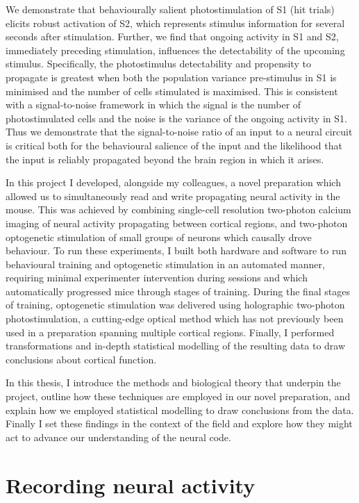 We demonstrate that behaviourally salient photostimulation of S1 (hit trials) elicits robust activation of S2, which represents stimulus information for several seconds after stimulation. Further, we find that ongoing activity in S1 and S2, immediately preceding stimulation, influences the detectability of the upcoming stimulus. Specifically, the photostimulus detectability and propensity to propagate is greatest when both the population variance pre-stimulus in S1 is minimised and the number of cells stimulated is maximised. This is consistent with a signal-to-noise framework in which the signal is the number of photostimulated cells and the noise is the variance of the ongoing activity in S1. Thus we demonstrate that the signal-to-noise ratio of an input to a neural circuit is critical both for the behavioural salience of the input and the likelihood that the input is reliably propagated beyond the brain region in which it arises.

In this project I developed, alongside my colleagues, a novel preparation which allowed us to simultaneously read and write propagating neural activity in the mouse. This was achieved by combining single-cell resolution two-photon calcium imaging of neural activity propagating between cortical regions, and two-photon optogenetic stimulation of small groups of neurons which causally drove behaviour. To run these experiments, I built both hardware and software to run behavioural training and optogenetic stimulation in an automated manner, requiring minimal experimenter intervention during sessions and which automatically progressed mice through stages of training. During the final stages of training, optogenetic stimulation was delivered using holographic two-photon photostimulation, a cutting-edge optical method which has not previously been used in a preparation spanning multiple cortical regions. Finally, I performed transformations and in-depth statistical modelling of the resulting data to draw conclusions about cortical function.

In this thesis, I introduce the methods and biological theory that underpin the project, outline how these techniques are employed in our novel preparation, and explain how we employed statistical modelling to draw conclusions from the data. Finally I set these findings in the context of the field and explore how they might act to advance our understanding of the neural code.

\section{Recording neural activity}

